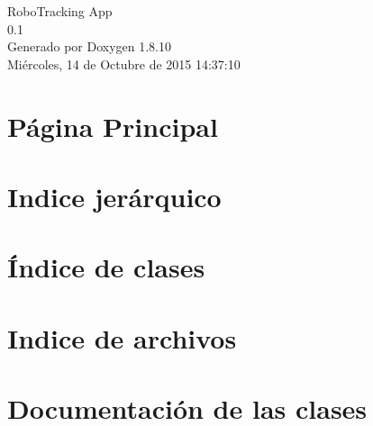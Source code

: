 \documentclass[twoside]{book}
\newcommand{\+}{\discretionary{\mbox{\scriptsize$\hookleftarrow$}}{}{}}
\newcommand{\clearemptydoublepage}{%
  \newpage{\pagestyle{empty}\cleardoublepage}%
}
\begin{document}
\hypersetup{pageanchor=false,
             bookmarks=true,
             bookmarksnumbered=true,
             pdfencoding=unicode
            }
\begin{titlepage}
\vspace*{7cm}
\begin{center}%
{\Large Robo\+Tracking App \\[1ex]\large 0.\+1 }\\
\vspace*{1cm}
{\large Generado por Doxygen 1.8.10}\\
\vspace*{0.5cm}
{\small Miércoles, 14 de Octubre de 2015 14:37:10}\\
\end{center}
\end{titlepage}
\clearemptydoublepage
\tableofcontents
\clearemptydoublepage
{}
\hypersetup{pageanchor=true}

\chapter{P\'{a}gina Principal}
\label{index}\hypertarget{index}{}
\chapter{Indice jerárquico}

\chapter{Índice de clases}

\chapter{Indice de archivos}

\chapter{Documentación de las clases}

























\end{document}
